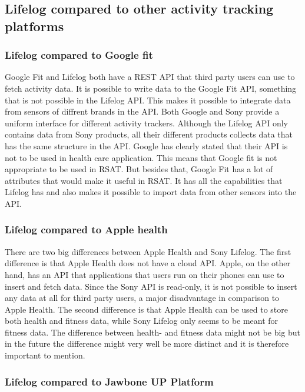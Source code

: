 \documentclass{cslthse-msc}
\begin{document}
\subsection{Lifelog compared to other activity tracking platforms}

\subsubsection{Lifelog compared to Google fit}
Google Fit and Lifelog both have a REST API that third party users can use to fetch activity data. It is possible to write data to the Google Fit API, something that is not possible in the Lifelog API. This makes it possible to integrate data from sensors of diffrent brands in the API. Both Google and Sony provide a uniform interface for different activity trackers. Although the Lifelog API only contains data from Sony products, all their different products collects data that has the same structure in the API. Google has clearly stated that their API is not to be used in health care application. This means that Google fit is not appropriate to be used in RSAT. But besides that, Google Fit has a lot of attributes that would make it useful in RSAT. It has all the capabilities that Lifelog has and also makes it possible to import data from other sensors into the API. 



\subsubsection{Lifelog compared to Apple health} 

There are two big differences between Apple Health and Sony Lifelog. The first difference is that Apple Health does not have a cloud API. Apple, on the other hand, has an API that applications that users run on their phones can use to insert and fetch data. Since the Sony API is read-only, it is not possible to insert any data at all for third party users, a major disadvantage in comparison to Apple Health. The second difference is that Apple Health can be used to store both health and fitness data, while Sony Lifelog only seems to be meant for fitness data. The difference between health- and fitness data might not be big but in the future the difference might very well be more distinct and it is therefore important to mention. 

\subsubsection{Lifelog compared to Jawbone UP Platform}
\end{document}
